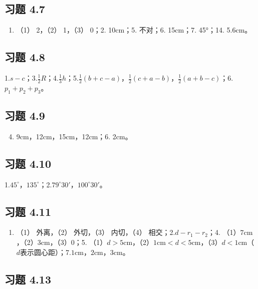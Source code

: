 \subsection{习题 4.7}

\begin{enumerate}
\item
  （1） 2，（2） 1，（3） 0；2. 10cm；5. 不对；6. 15cm；7. 45°；14.
  5.6cm。
\end{enumerate}

\subsection{习题 4.8}

1.\(s - c\)；3.\(\frac{1}{2} R\)；4.\(\frac{1}{3} h\)；5.\(\frac{1}{2}(b + c - a)\)，\(\frac{1}{2}(c + a - b)\)，\(\frac{1}{2}(a + b - c)\)；6.\(p_1 + p_2 + p_3\)。

\subsection{习题 4.9}

\begin{enumerate}
\setcounter{enumi}{3}
\item
  9cm，12cm，15cm，12cm；6. 2cm。
\end{enumerate}

\subsection{习题 4.10}

1.\(45^{\circ}\)，\(135^{\circ}\)；2.\(79^{\circ}30'\)，\(100^{\circ}30'\)。

\subsection{习题 4.11}

\begin{enumerate}
\item
  （1） 外离，（2） 外切，（3） 内切，（4）
  相交；2.\(d - r_{1} - r_{2}\)；4.
  （1）\(7\mathrm{cm}\)，（2）\(3\mathrm{cm}\)，（3）\(0\)；5.
  （1）\(d > 5\mathrm{cm}\)，（2）\(1\mathrm{cm} < d < 5\mathrm{cm}\)，（3）\(d < 1\mathrm{cm}\)（\(d\)表示圆心距）；7.\(1\mathrm{cm}\)，\(2\mathrm{cm}\)，\(3\mathrm{cm}\)。
\end{enumerate}

\subsection{习题 4.13}

